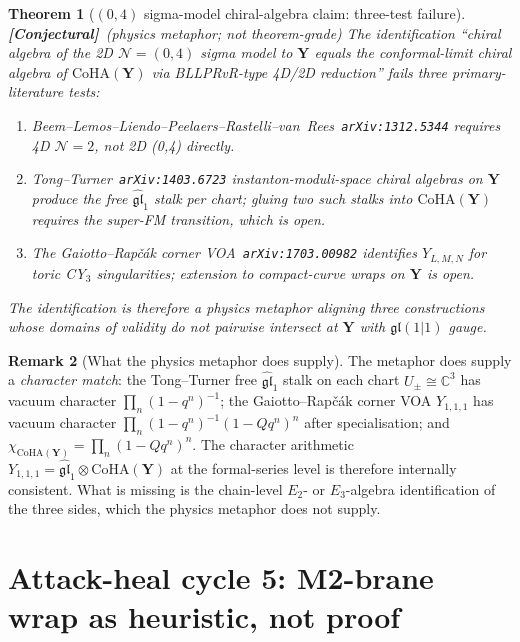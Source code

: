 \documentclass[11pt]{amsart}
\newtheorem{theorem}{Theorem}[section]
\theoremstyle{definition}
\newtheorem{remark}[theorem]{Remark}
\providecommand{\CoHA}{\mathrm{CoHA}}
\providecommand{\bY}{\mathbf{Y}}
\providecommand{\bC}{\mathbb{C}}
\providecommand{\fgl}{\mathfrak{gl}}
\providecommand{\cN}{\mathcal{N}}
\providecommand{\ClaimStatusConjectured}{\textbf{\textsf{[Conjectural]}}}
\begin{document}
\begin{theorem}[$(0,4)$ sigma-model chiral-algebra claim: three-test
failure]
\label{thm:0-4-sigma-model-metaphor}
\ClaimStatusConjectured\ \emph{(physics metaphor; not theorem-grade)}
The identification ``chiral algebra of the 2D $\cN=(0,4)$ sigma
model to $\bY$ equals the conformal-limit chiral algebra of
$\CoHA(\bY)$ via BLLPRvR-type 4D/2D reduction'' fails three
primary-literature tests:
\begin{enumerate}[leftmargin=2em,label=(\roman*)]
\item Beem--Lemos--Liendo--Peelaers--Rastelli--van~Rees~\texttt{arXiv:1312.5344}
  requires 4D $\cN=2$, not 2D (0,4) directly.
\item Tong--Turner~\texttt{arXiv:1403.6723} instanton-moduli-space
  chiral algebras on $\bY$ produce the \emph{free} $\widehat{\fgl}_1$
  stalk per chart; gluing two such stalks into $\CoHA(\bY)$ requires
  the super-FM transition, which is open.
\item The Gaiotto--Rap\v{c}\'ak corner
  VOA~\texttt{arXiv:1703.00982} identifies $Y_{L,M,N}$ for toric
  CY$_3$ singularities; extension to compact-curve wraps on $\bY$ is
  open.
\end{enumerate}
The identification is therefore a \emph{physics metaphor} aligning
three constructions whose domains of validity do not pairwise
intersect at $\bY$ with $\fgl(1|1)$ gauge.
\end{theorem}

\begin{remark}[What the physics metaphor does supply]
The metaphor does supply a \emph{character match}: the Tong--Turner
free $\widehat{\fgl}_1$ stalk on each chart $U_\pm \cong \bC^3$ has
vacuum character $\prod_n(1-q^n)^{-1}$; the Gaiotto--Rap\v{c}\'ak
corner VOA $Y_{1,1,1}$ has vacuum character
$\prod_n(1-q^n)^{-1}(1-Qq^n)^n$ after specialisation; and
$\chi_{\CoHA(\bY)} = \prod_n(1-Qq^n)^n$. The character arithmetic
$Y_{1,1,1} = \widehat{\fgl}_1 \otimes \CoHA(\bY)$ at the formal-series
level is therefore internally consistent. What is missing is the
chain-level $E_2$- or $E_3$-algebra identification of the three
sides, which the physics metaphor does not supply.
\end{remark}

\section{Attack-heal cycle 5: M2-brane wrap as heuristic, not proof}
\end{document}
